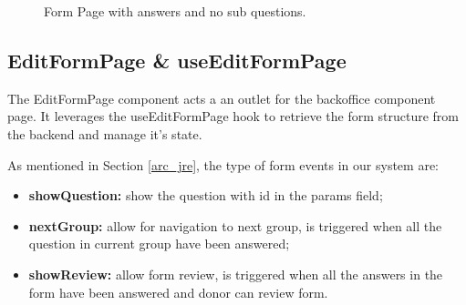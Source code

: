 \begin{figure}[H]
	\begin{center}
	\end{center}
	\caption{Form Page with answers and no sub questions.}\label{fig:form3}
\end{figure}

\newpage

\subsection{EditFormPage \& useEditFormPage} \label{edit_form}
The EditFormPage component acts a an outlet for the backoffice component page. It leverages the useEditFormPage hook to retrieve the form structure from the backend and manage it's state.

As mentioned in Section \ref{arc_jre}, the type of form events in our system are:
\begin{itemize}
	\item \textbf{showQuestion:} show the question with id in the params field;
	\item \textbf{nextGroup:} allow for navigation to next group, is triggered when all the question in current group have been answered;
	\item \textbf{showReview:} allow form review, is triggered when all the answers in the form have been answered and donor can review form.
\end{itemize}

